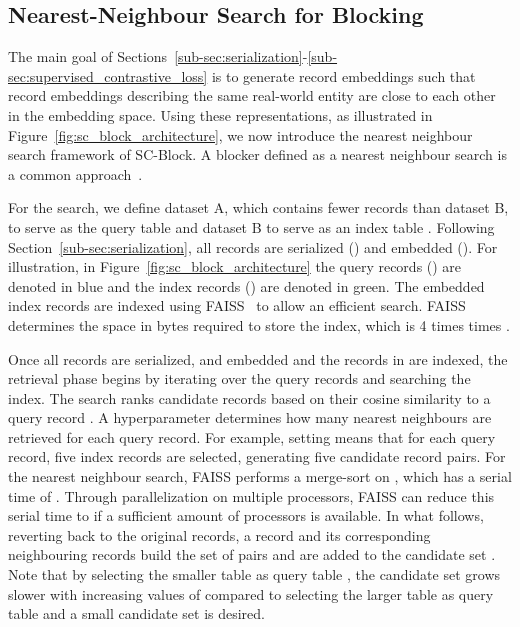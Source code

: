 \documentclass[sigconf,nonacm]{acmart}
\begin{document}
\subsection{Nearest-Neighbour Search for Blocking}
\label{sub-sec:blocking-framework}

The main goal of Sections~\ref{sub-sec:serialization}-\ref{sub-sec:supervised_contrastive_loss} is to generate record embeddings such that record embeddings describing the same real-world entity are close to each other in the embedding space. Using these representations, as illustrated in Figure~\ref{fig:sc_block_architecture}, we now introduce the nearest neighbour search framework of SC-Block. A blocker defined as a nearest neighbour search is a common approach~\cite{thirumuruganathan_deep_2021, zhang_autoblock_2020, wang_sudowoodo_2022}.

For the search, we define dataset A, which contains fewer records than dataset B, to serve as the query table  and dataset B to serve as an index table . Following Section~\ref{sub-sec:serialization}, all records are  serialized () and embedded (). For illustration, in Figure~\ref{fig:sc_block_architecture} the query records () are denoted in blue and the index records () are denoted in green. The embedded index records are indexed using FAISS~\cite{johnson_billion-scale_2021} to allow an efficient search. FAISS determines the space in bytes required to store the index, which is 4 times  times .

Once all records are serialized, and embedded and the records in  are indexed,  the retrieval phase begins by iterating over the query records and searching the index. The search ranks candidate records  based on their cosine similarity to a query record . A hyperparameter  determines how many nearest neighbours are retrieved for each query record. For example, setting  means that for each query record, five index records are selected, generating five candidate record pairs. For the nearest neighbour search, FAISS performs a merge-sort on , which has a serial time of . Through parallelization on multiple processors, FAISS can reduce this serial time to  if a sufficient amount of processors is available. In what follows, reverting back to the original records, a record  and its  corresponding neighbouring records  build the set of pairs  and are added to the candidate set . Note that by selecting the smaller table as query table , the candidate set grows slower with increasing values of  compared to selecting the larger table as query table and a small candidate set is desired.
\end{document}
